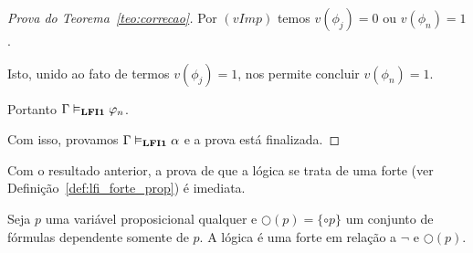 \begin{proof}[Prova do Teorema~\ref{teo:correcao}]
         Por $(vImp)$ temos $v(\phi_{j}) = 0$ ou $v(\phi_{n}) = 1$. 
         
         Isto, unido ao fato de termos $v(\phi_{j}) = 1$, nos permite concluir $v(\phi_{n}) = 1$. 
         
         Portanto $\Gamma \vDash_{{\normalfont\textbf{LFI1}}{}} \varphi_{n}$.

         \noindent Com isso, provamos $\Gamma \vDash_{{\normalfont\textbf{LFI1}}{}} \alpha$ e a prova está finalizada.

    \end{proof}

    Com o resultado anterior, a prova de que a lógica \lfium{} se trata de uma \lfi{} forte (ver Definição~\ref{def:lfi_forte_prop}) é imediata.

    \begin{corolario}\label{cor:lfi_forte}
        Seja $p$ uma variável proposicional qualquer e $\bigcirc(p) = \{\circ p\}$ um conjunto de fórmulas dependente somente de $p$. A lógica \lfium{} é uma \lfi{} forte em relação a $\neg$ e $\bigcirc(p)$.
    \end{corolario}


